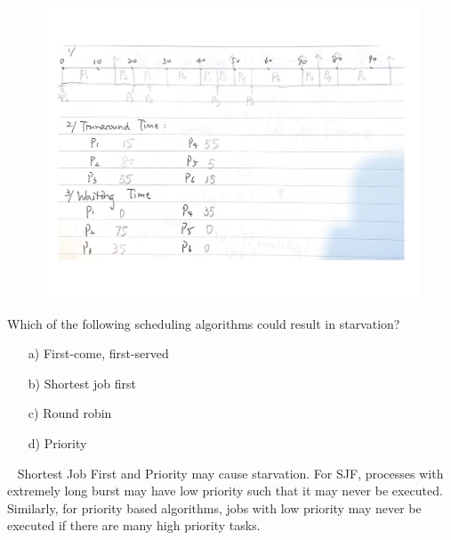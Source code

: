 \begin{exercise}[]
{    }
  \begin{solution}
  \par{~}
  \begin{figure}[ht]
    \begin{center}
        \includegraphics[width=180mm]{ex10.jpg}
    \end{center}\end{figure}
  \end{solution}
  \label{ex1}
\end{exercise}

\newpage
\begin{exercise}[]{
    Which of the following scheduling algorithms could result in starvation?
    \begin{enumerate}
         \item [a)]
     First-come, first-served
    \item [b)]
    Shortest job first
    \item [c)]
     Round robin
    \item [d)]
     Priority
    \end{enumerate}
}
  \begin{solution}
  \par{~}
  Shortest Job First and Priority may cause starvation. For SJF, processes with extremely long burst may have low priority such that it may never be executed. Similarly, for priority based algorithms, jobs with low priority may never be executed if there are many high priority tasks.
  \end{solution}
  \label{ex2}
\end{exercise}
